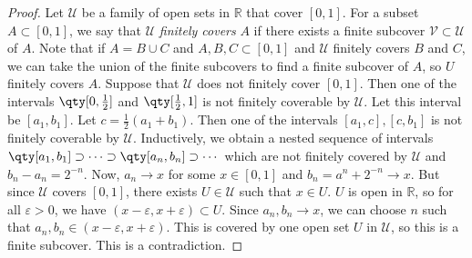 \begin{proof}
	Let \( \mathcal U \) be a family of open sets in \( \mathbb R \) that cover \( [0,1] \).
	For a subset \( A \subset [0,1] \), we say that \( \mathcal U \) \textit{finitely covers} \( A \) if there exists a finite subcover \( \mathcal V \subset \mathcal U \) of \( A \).
	Note that if \( A = B \cup C \) and \( A,B,C \subset [0,1] \) and \( \mathcal U \) finitely covers \( B \) and \( C \), we can take the union of the finite subcovers to find a finite subcover of \( A \), so \( U \) finitely covers \( A \).
	Suppose that \( \mathcal U \) does not finitely cover \( [0,1] \).
	Then one of the intervals \( \qty[0, \frac{1}{2}] \) and \( \qty[\frac{1}{2}, 1] \) is not finitely coverable by \( \mathcal U \).
	Let this interval be \( [a_1, b_1] \).
	Let \( c = \frac{1}{2} (a_1 + b_1) \).
	Then one of the intervals \( [a_1, c], [c,b_1] \) is not finitely coverable by \( \mathcal U \).
	Inductively, we obtain a nested sequence of intervals \( \qty[a_1, b_1] \supset \dots \supset \qty[a_n, b_n] \supset \cdots \) which are not finitely covered by \( \mathcal U \) and \( b_n - a_n = 2^{-n} \).
	Now, \( a_n \to x \) for some \( x \in [0,1] \) and \( b_n = a^n + 2^{-n} \to x \).
	But since \( \mathcal U \) covers \( [0,1] \), there exists \( U \in \mathcal U \) such that \( x \in U \).
	\( U \) is open in \( \mathbb R \), so for all \( \varepsilon > 0 \), we have \( (x-\varepsilon, x+\varepsilon) \subset U \).
	Since \( a_n, b_n \to x \), we can choose \( n \) such that \( a_n, b_n \in (x-\varepsilon, x+\varepsilon) \).
	This is covered by one open set \( U \) in \( \mathcal U \), so this is a finite subcover.
	This is a contradiction.
\end{proof}
